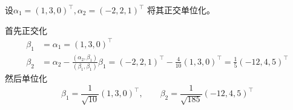 \begin{example}
    设$\alpha_1=(1,3,0)^\intercal, \alpha_2 = (-2,2,1)^\intercal$
    将其正交单位化。
\end{example}
\begin{solution}
    首先正交化
    \begin{align*}
        \beta_1 & = \alpha_1   =   (1,3,0)^\intercal                                                                                                                       \\
        \beta_2 & = \alpha_2 - \frac{(\alpha_2,\beta_1)}{(\beta_1, \beta_1)}\beta_1  = (-2,2,1)^\intercal - \frac{4}{10}(1,3,0)^\intercal = \frac{1}{5}(-12,4,5)^\intercal
    \end{align*}
    然后单位化
    \[
        \beta_1 = \frac{1}{\sqrt{10}}(1,3,0)^\intercal,\qquad \beta_2 = \frac{1}{\sqrt{185}}(-12,4,5)^\intercal
    \]
\end{solution}